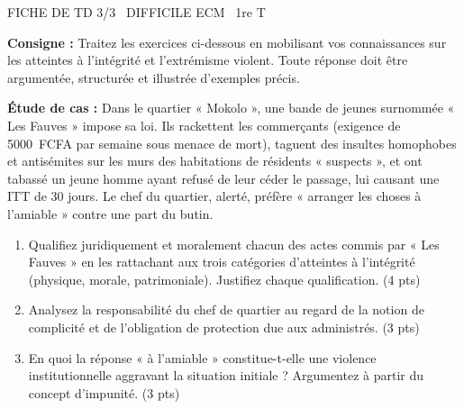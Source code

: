 \documentclass[11pt]{article}
\begin{document}
\begin{tcolorbox}[enhanced,colback=popink,colframe=popink,arc=10pt,boxrule=0pt,left=12pt,right=12pt,top=9pt,bottom=9pt]
{\color{white}\popxbold\small FICHE DE TD 3/3 \textbullet\ DIFFICILE \hfill ECM \textbullet\ 1re T\par}
\end{tcolorbox}
\vspace{4pt}
\noindent \textbf{Consigne :} Traitez les exercices ci-dessous en mobilisant vos connaissances sur les atteintes à l'intégrité et l'extrémisme violent. Toute réponse doit être argumentée, structurée et illustrée d'exemples précis.

\begin{exercice}
\textbf{Étude de cas :} Dans le quartier « Mokolo », une bande de jeunes surnommée « Les Fauves » impose sa loi. Ils rackettent les commerçants (exigence de \SI{5000}{FCFA} par semaine sous menace de mort), taguent des insultes homophobes et antisémites sur les murs des habitations de résidents « suspects », et ont tabassé un jeune homme ayant refusé de leur céder le passage, lui causant une ITT de 30 jours. Le chef du quartier, alerté, préfère « arranger les choses à l'amiable » contre une part du butin.
\begin{enumerate}
    \item Qualifiez juridiquement et moralement chacun des actes commis par « Les Fauves » en les rattachant aux trois catégories d'atteintes à l'intégrité (physique, morale, patrimoniale). Justifiez chaque qualification. (4 pts)
    \item Analysez la responsabilité du chef de quartier au regard de la notion de complicité et de l'obligation de protection due aux administrés. (3 pts)
    \item En quoi la réponse « à l'amiable » constitue-t-elle une violence institutionnelle aggravant la situation initiale ? Argumentez à partir du concept d'impunité. (3 pts)
\end{enumerate}
\end{exercice}
\end{document}

